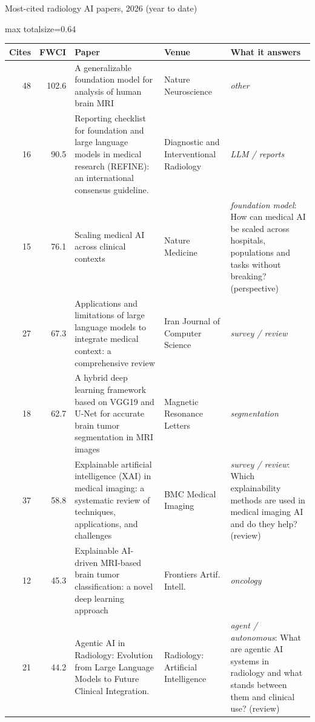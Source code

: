 \documentclass[aspectratio=169]{beamer}
\renewcommand{\arraystretch}{1.08}
\begin{document}
\begin{frame}[category=Journals/Preprints]{Most-cited radiology AI papers, 2026 (year to date)}
\tiny
\begin{adjustbox}{max totalsize={\textwidth}{0.64\textheight}}
\renewcommand{\arraystretch}{1.2}
\begin{tabular}{|r|r|>{\raggedright\arraybackslash}p{}|>{\raggedright\arraybackslash}p{}|>{\raggedright\arraybackslash}p{}|}
\hline \textbf{Cites} & \textbf{FWCI} & \textbf{Paper} & \textbf{Venue} & \textbf{What it answers} \\ \hline
48 & 102.6 & A generalizable foundation model for analysis of human brain MRI & Nature Neuroscience & \textit{other} \\ \hline
16 & 90.5 & Reporting checklist for foundation and large language models in medical research (REFINE): an international consensus guideline. & Diagnostic and Interventional Radiology & \textit{LLM / reports} \\ \hline
15 & 76.1 & Scaling medical AI across clinical contexts & Nature Medicine & \textit{foundation model}: How can medical AI be scaled across hospitals, populations and tasks without breaking? (perspective) \\ \hline
27 & 67.3 & Applications and limitations of large language models to integrate medical context: a comprehensive review & Iran Journal of Computer Science & \textit{survey / review} \\ \hline
18 & 62.7 & A hybrid deep learning framework based on VGG19 and U-Net for accurate brain tumor segmentation in MRI images & Magnetic Resonance Letters & \textit{segmentation} \\ \hline
37 & 58.8 & Explainable artificial intelligence (XAI) in medical imaging: a systematic review of techniques, applications, and challenges & BMC Medical Imaging & \textit{survey / review}: Which explainability methods are used in medical imaging AI and do they help? (review) \\ \hline
12 & 45.3 & Explainable AI-driven MRI-based brain tumor classification: a novel deep learning approach & Frontiers Artif. Intell. & \textit{oncology} \\ \hline
21 & 44.2 & Agentic AI in Radiology: Evolution from Large Language Models to Future Clinical Integration. & Radiology: Artificial Intelligence & \textit{agent / autonomous}: What are agentic AI systems in radiology and what stands between them and clinical use? (review) \\ \hline

\end{tabular}
\end{adjustbox}
\end{frame}
\end{document}

